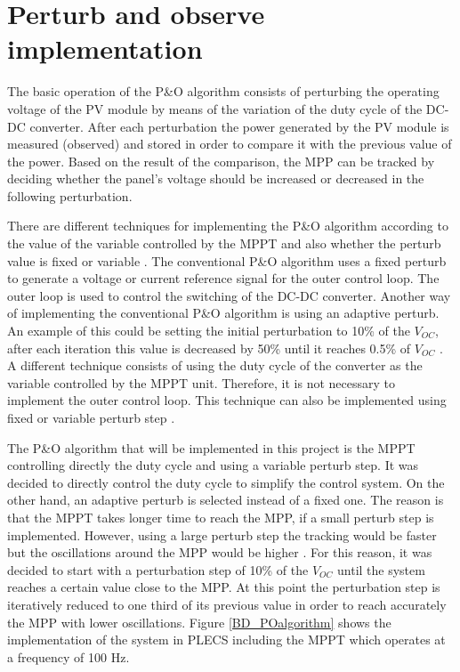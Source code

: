 \section{Perturb and observe implementation}\label{MPPTImplementation}

The basic operation of the P\&O algorithm consists of perturbing the operating voltage of the PV module by means of the variation of the duty cycle of the DC-DC converter. After each perturbation the power generated by the PV module is measured (observed) and stored in order to compare it with the previous value of the power. Based on the result of the comparison, the MPP can be tracked by deciding whether the panel's voltage should be increased or decreased in the following perturbation.

There are different techniques for implementing the P\&O algorithm according to the value of the variable controlled by the MPPT and also whether the perturb value is fixed or variable \cite{implementationPandO}. The conventional P\&O algorithm uses a fixed perturb to generate a voltage or current reference signal for the outer control loop. The outer loop is used to control the switching of the DC-DC converter. Another way of implementing the conventional P\&O algorithm is using an adaptive perturb. An example of this could be setting the initial perturbation to 10\% of the $V_{OC}$, after each iteration this value is decreased by 50\% until it reaches 0.5\% of $V_{OC}$ \cite{implementationPandO}. A different technique consists of using the duty cycle of the converter as the variable controlled by the MPPT unit. Therefore, it is not necessary to implement the outer control loop. This technique can also be implemented using fixed or variable perturb step \cite{implementationPandO}. 

The P\&O algorithm that will be implemented in this project is the MPPT controlling directly the duty cycle and using a variable perturb step. It was decided to directly control the duty cycle to simplify the control system. On the other hand, an adaptive perturb is selected instead of a fixed one. The reason is that the MPPT takes longer time to reach the MPP, if a small perturb step is implemented. However, using a large perturb step the tracking would be faster but the oscillations around the MPP would be higher \cite{implementationPandO}. For this reason, it was decided to start with a perturbation step of 10\% of the $V_{OC}$ until the system reaches a certain value close to the MPP. At this point the perturbation step is iteratively reduced to one third of its previous value in order to reach accurately the MPP with lower oscillations. Figure \ref{BD_POalgorithm} shows the implementation of the system in PLECS including the MPPT which operates at a frequency of 100 Hz. 

